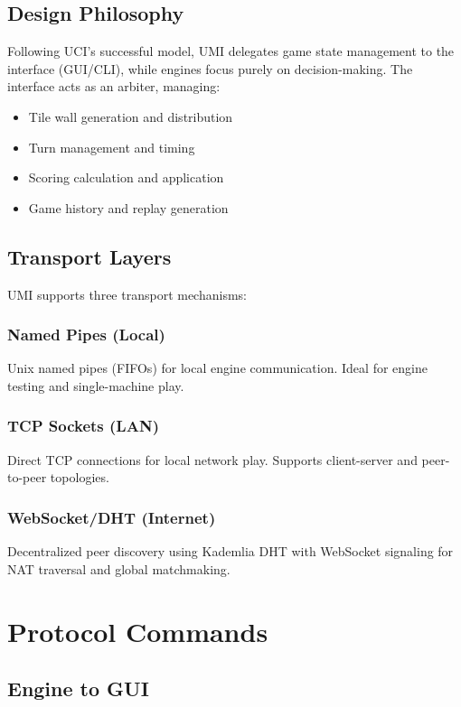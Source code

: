 \documentclass[11pt,a4paper]{article}
\begin{document}
\subsection{Design Philosophy}

Following UCI's successful model, UMI delegates game state management to the interface (GUI/CLI), while engines focus purely on decision-making. The interface acts as an arbiter, managing:
\begin{itemize}
    \item Tile wall generation and distribution
    \item Turn management and timing
    \item Scoring calculation and application
    \item Game history and replay generation
\end{itemize}

\subsection{Transport Layers}

UMI supports three transport mechanisms:

\subsubsection{Named Pipes (Local)}
Unix named pipes (FIFOs) for local engine communication. Ideal for engine testing and single-machine play.

\subsubsection{TCP Sockets (LAN)}
Direct TCP connections for local network play. Supports client-server and peer-to-peer topologies.

\subsubsection{WebSocket/DHT (Internet)}
Decentralized peer discovery using Kademlia DHT with WebSocket signaling for NAT traversal and global matchmaking.

\section{Protocol Commands}

\subsection{Engine to GUI}
\end{document}

